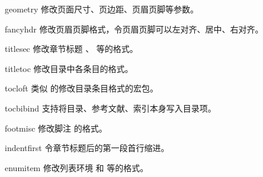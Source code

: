 \begin{pkglist}
  \item[geometry] 修改页面尺寸、页边距、页眉页脚等参数。
  \item[fancyhdr] 修改页眉页脚格式，令页眉页脚可以左对齐、居中、右对齐。
  \item[titlesec] 修改章节标题 、 等的格式。
  \item[titletoc] 修改目录中各条目的格式。
  \item[tocloft]  类似  的修改目录条目格式的宏包。
  \item[tocbibind] 支持将目录、参考文献、索引本身写入目录项。
  \item[footmisc] 修改脚注  的格式。
  \item[indentfirst] 令章节标题后的第一段首行缩进。
  \item[enumitem] 修改列表环境  和  等的格式。
\end{pkglist}

\endinput